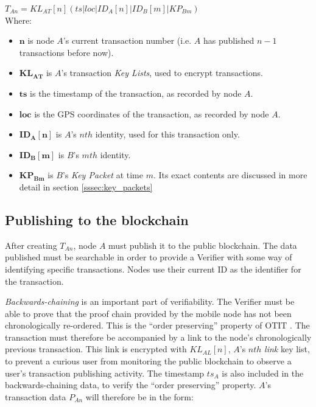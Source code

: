 $T_{An} = KL_{AT}[n](ts|loc|ID_{A}[n]|ID_{B}[m]|KP_{Bm})$
\\

Where:
\begin{itemize}[noitemsep,topsep=0pt]
	\item[] $\mathbf{n}$ is node $A$'s current transaction number (i.e. $A$ has published $n-1$ transactions before now).
	\item[] $\mathbf{KL_{AT}}$ is $A$'s transaction \textit{Key Lists}, used to encrypt transactions.	
	\item[] $\mathbf{ts}$ is the timestamp of the transaction, as recorded by node $A$.
	\item[] $\mathbf{loc}$ is the GPS coordinates of the transaction, as recorded by node $A$.
	\item[] $\mathbf{ID_{A}[n]}$ is $A$'s $nth$ identity, used for this transaction only.
	\item[] $\mathbf{ID_{B}[m]}$ is $B$'s $mth$ identity.
	\item[] $\mathbf{KP_{Bm}}$ is $B$'s \textit{Key Packet} at time $m$. Its exact contents are discussed in more detail in section \ref{sssec:key_packets}
\end{itemize}

\subsection{Publishing to the blockchain}
After creating $T_{An}$, node $A$ must publish it to the public blockchain. The data published must be searchable in order to provide a Verifier with some way of identifying specific transactions. Nodes use their current ID as the identifier for the transaction.

\textit{Backwards-chaining} is an important part of verifiability. The Verifier must be able to prove that the proof chain provided by the mobile node has not been chronologically re-ordered. This is the ``order preserving'' property of OTIT \cite{otit}. The transaction must therefore be accompanied by a link to the node's chronologically previous transaction. This link is encrypted with $KL_{AL}[n]$, $A$'s $nth$ \textit{link} key list, to prevent a curious user from monitoring the public blockchain to observe a user's transaction publishing activity. The timestamp $ts_A$ is also included in the backwards-chaining data, to verify the ``order preserving'' property. $A$'s transaction data $P_{An}$ will therefore be in the form:
\\

